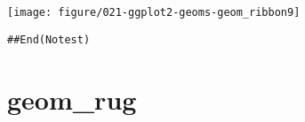 \documentclass[a4paper,titlepage]{tufte-handout}\usepackage[]{graphicx}\usepackage[]{color}
\makeatletter
\def\maxwidth{ %
  \ifdim\Gin@nat@width>\linewidth
    \linewidth
  \else
    \Gin@nat@width
  \fi
}
\newenvironment{kframe}{%
 \def\at@end@of@kframe{}%
 \ifinner\ifhmode%
  \def\at@end@of@kframe{\end{minipage}}%
  \begin{minipage}{\columnwidth}%
 \fi\fi%
 \def\FrameCommand##1{\hskip\@totalleftmargin \hskip-\fboxsep
 \colorbox{shadecolor}{##1}\hskip-\fboxsep
     \hskip-\linewidth \hskip-\@totalleftmargin \hskip\columnwidth}%
 \MakeFramed {\advance\hsize-\width
   \@totalleftmargin\z@ \linewidth\hsize
   \@setminipage}}%
 {\par\unskip\endMakeFramed%
 \at@end@of@kframe}
\newenvironment{knitrout}{}{} %
\makeatother
\begin{document}
\begin{knitrout}
\begin{kframe}
{\ttfamily\noindent\color{warningcolor}{\#\# Warning: Removed 9 rows containing missing values (position\_stack).}}\end{kframe}
\texttt{[image: figure/021-ggplot2-geoms-geom\_ribbon9]} 
\begin{kframe}\begin{alltt}
## End(No test)


\end{alltt}
\end{kframe}
\end{knitrout}



\section{geom\_rug}
\end{document}
